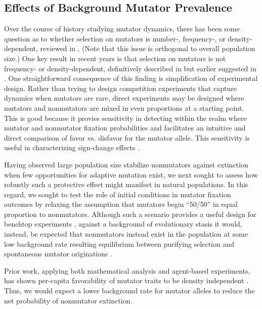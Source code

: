 \subsection{Effects of Background Mutator Prevalence}
\label{sec:background-hypermutator-prevalence}

Over the course of history studying mutator dynamics, there has been some question as to whether selection on mutators is number-, frequency-, or density-dependent, reviewed in \citep{raynes2019selection}.
(Note that this issue is orthogonal to overall population size.)
One key result in recent years is that selection on mutators is not frequency- or density-dependent, definitively described in \citep{raynes2019selection} but earlier suggested in \citep{wylie2009fixation}.
One straightforward consequence of this finding is simplification of experimental design.
Rather than trying to design competition experiments that capture dynamics when mutators are rare, direct experiments may be designed where mutators and nonmutators are mixed in even proportions at a starting point.
This is good because it provies sensitivity in detecting within the realm where mutator and nonmutator fixation probabilities and facilitates an intuitive and direct comparison of favor vs. disfavor for the mutator allele.
This sensitivity is useful in characterizing sign-change effects \citep{raynes2018selection}.



Having observed large population size stabilize nonmutators against extinction when few opportunities for adaptive mutation exist, we next sought to assess how robustly such a protective effect might manifest in natural populations.
In this regard, we sought to test the role of initial conditions in mutator fixation outcomes by relaxing the assumption that mutators begin ``50/50'' in equal proportion to nonmutators.
Although such a scenario provides a useful design for benchtop experiments \citep{raynes2018sign}, against a background of evolutionary stasis it would, instead, be expected that nonmutators instead exist in the population at some low background rate resulting equilibrium between purifying selection and spontaneous mutator originations \citep{desai2011balance,johnson1999approach}.

Prior work, applying both mathematical analysis and agent-based experiments, has shown per-capita favorability of mutator traits to be density independent \citep{raynes2019selection}.
Thus, we would expect a lower background rate for mutator alleles to reduce the net probability of nonmutator extinction.

